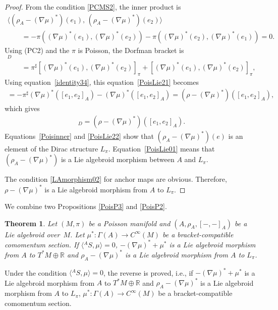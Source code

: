 \documentclass[pdftex]{sigma}
\numberwithin{equation}{section}
\newtheorem{Theorem}{Theorem}[section]
\def\bR{{\mathbb{R}}}
\newcommand{\rhoa}{{\rho_A}}
\newcommand{\bracket}[2]{\langle #1,\,#2\rangle}
\begin{document}
\begin{proof}
From the condition \eqref{PCMS2}, the inner product is
\begin{gather}
 \bracket{(\rhoa - (\nabla \mu)^*)(e_1)}{(\rhoa - (\nabla \mu)^*)(e_2)}
\nonumber \\
\qquad= - \pi((\nabla \mu)^*(e_1), (\nabla \mu)^*(e_2))
- \pi((\nabla \mu)^*(e_2), (\nabla \mu)^*(e_1)) =0.
\label{Poisinner}
\end{gather}
Using (PC2) and the $\pi$ is Poisson, the Dorfman bracket is
\begin{gather}
[(\rhoa - (\nabla \mu)^*)(e_1), (\rhoa - (\nabla \mu)^*)(e_2)]_D\nonumber\\
\qquad= \pi^{\sharp}[(\nabla \mu)^*(e_1), (\nabla \mu)^*(e_2)]_{\pi}
+ [(\nabla \mu)^*(e_1), (\nabla \mu)^*(e_2)]_{\pi},
\label{PoisLie21}
\end{gather}
Using equation~\eqref{identity34}, this equation~\eqref{PoisLie21}
becomes
\begin{gather}
= - \pi^{\sharp} (\nabla \mu)^*([e_1, e_2]_A)
- (\nabla \mu)^*([e_1, e_2]_A)
= (\rho - (\nabla \mu)^*)([e_1, e_2]_A),
\label{PoisLie22}
\end{gather}
which gives
\begin{gather}
[(\rhoa - (\nabla \mu)^*)(e_1), (\rhoa - (\nabla \mu)^*)(e_2)]_D
= (\rho - (\nabla \mu)^*)([e_1, e_2]_A).
\label{PoisLie01}
\end{gather}
Equations~\eqref{Poisinner} and \eqref{PoisLie22} show that
$(\rhoa - (\nabla \mu)^*)(e)$ is an element of the Dirac structure
$L_{\pi}$.
Equation~\eqref{PoisLie01} means that $(\rhoa - (\nabla \mu)^*)$ is
a Lie algebroid morphism between $A$ and $L_{\pi}$.

The condition \eqref{LAmorphism02} for anchor maps are obvious.
Therefore, $\rho - (\nabla \mu)^*$ is a Lie algebroid morphism
from $A$ to $L_{\pi}$.
\end{proof}


We combine two Propositions \ref{PoisP3} and \ref{PoisP2}.
\begin{Theorem}
Let $(M, \pi)$ be a Poisson manifold and $(A, \rhoa, [-,-]_A)$ be a Lie algebroid over~$M$.
Let $\mu^*\colon \Gamma(A) \rightarrow C^{\infty}(M)$ be a bracket-compatible comomentum section. If $\bigl\langle {}^A S,\mu\bigr\rangle = 0$,
$-(\nabla \mu)^* + \mu^*$ is a Lie algebroid morphism from
$A$ to $T^*M \oplus \bR$ and
$\rhoa - (\nabla \mu)^*$ is a Lie algebroid morphism
from $A$ to $L_{\pi}$.
\end{Theorem}
Under the condition $\bigl\langle {}^A S,\mu\bigr\rangle = 0$,
the reverse is proved, i.e.,
if $-(\nabla \mu)^* + \mu^*$ is a Lie algebroid morphism from
$A$ to $T^*M \oplus \bR$ and
$\rhoa - (\nabla \mu)^*$ is a Lie algebroid morphism
from $A$ to $L_{\pi}$,
$\mu^*\colon \Gamma(A) \rightarrow C^{\infty}(M)$ be a bracket-compatible comomentum section.
\end{document}
